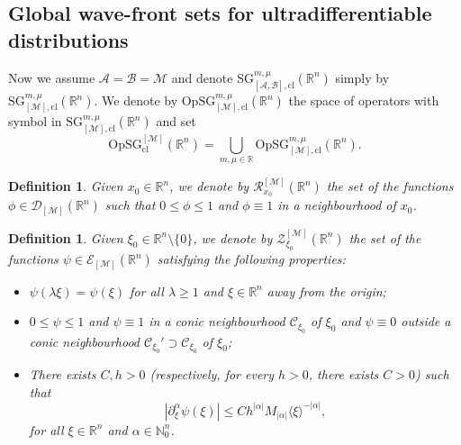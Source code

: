 \documentclass[11pt,reqno]{amsart}
\numberwithin{equation}{section}
\newtheorem{definition}[theorem]{Definition}
\newcommand{\R}{{\mathbb{R}}} %
\newcommand{\N}{{\mathbb{N}}} %
\newcommand{\E}{{\mathcal{E}}}
\newcommand{\D}{{\mathcal{D}}}
\newcommand{\RR}{{\mathcal{R}}}
\newcommand{\ZZ}{{\mathcal{Z}}}
\newcommand{\Op}{{\mathrm{Op}}}
\newcommand{\SG}{{\mathrm{SG}}}
\newcommand{\M}{{\mathcal{M}}} %
\newcommand{\A}{{\mathcal{A}}} %
\newcommand{\B}{{\mathcal{B}}} %
\newcommand{\cl}{{\mathrm{cl}}}
\begin{document}
\subsection{Global wave-front sets for ultradifferentiable distributions}\label{sec:globwfs}

Now we assume $\A=\B=\M$ and denote ${\SG}_{[\A,\B],\cl}^{m,\mu}(\R^n)$ simply by ${\SG}_{[\M],\cl}^{m,\mu}(\R^n)$. We denote by $\Op {\SG}_{[\M],\cl}^{m,\mu}(\R^n)$ the space of operators with symbol in ${\SG}_{[\M],\cl}^{m,\mu}(\R^n)$ and set
%
\[\Op {\SG}_{\cl}^{[\M]}(\R^n) = \bigcup_{m,\mu\in\R}\Op {\SG}_{[\M],\cl}^{m,\mu}(\R^n).\]

\begin{definition}
	Given $x_0\in\R^n$, we denote by $\RR_{x_0}^{[\M]}(\R^n)$ the set of the functions $\phi\in\D_{[\M]}(\R^n)$ such that $0\leq\phi\leq 1$ and $\phi\equiv 1$ in a neighbourhood of $x_0$.
\end{definition}


\begin{definition}
	Given $\xi_0\in\R^n\setminus\{0\}$, we denote by $\ZZ_{\xi_0}^{[\M]}(\R^n)$ the set of the functions $\psi\in\E_{[\M]}(\R^n)$ satisfying the following properties:
	\begin{itemize}
		\item $\psi(\lambda\xi)=\psi(\xi)$ for all $\lambda\geq 1$ and $\xi\in\R^n$ away from the origin;
		
		\item $0\leq\psi\leq 1$ and $\psi\equiv 1$ in a conic neighbourhood $\mathcal{C}_{\xi_0}$ of $\xi_0$ and $\psi\equiv 0$ outside a conic neighbourhood $\mathcal{C}_{\xi_0}'\supset \mathcal{C}_{\xi_0}$ of $\xi_0$;
		
		\item There exists $C,h>0$ (respectively, for every $h>0$, there exists $C>0$) such that
		\begin{equation*}
			|\partial_\xi^\alpha\psi(\xi)|\leq Ch^{|\alpha|}M_{|\alpha|}\langle\xi\rangle^{-|\alpha|},
		\end{equation*}
		for all $\xi\in\R^n$ and $\alpha\in\N_0^n$. 
	\end{itemize}
\end{definition}
\end{document}

